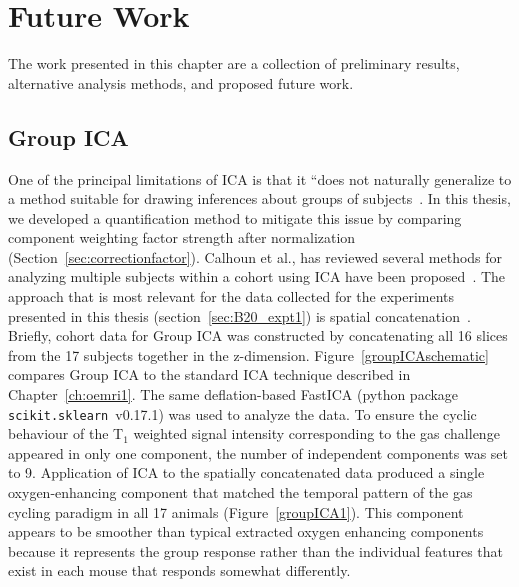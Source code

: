 
\chapter{Future Work}
\label{ch:futurework}

The work presented in this chapter are a collection of preliminary results, alternative analysis methods, and proposed future work. 

\section{Group ICA}

One of the principal limitations of \acs{ICA} is that it ``does not naturally generalize to a method suitable for drawing inferences about groups of subjects~\cite{Calhoun:2009jr}.
In this thesis, we developed a quantification method to mitigate this issue by comparing component weighting factor strength after normalization (Section~\ref{sec:correctionfactor}).
Calhoun et al., has reviewed several methods for analyzing multiple subjects within a cohort using \acs{ICA} have been proposed~\cite{Calhoun:2009jr}.
The approach that is most relevant for the data collected for the experiments presented in this thesis (section~\ref{sec:B20_expt1}) is spatial concatenation~\cite{Calhoun:2001jx}.
Briefly, cohort data for Group ICA was constructed by concatenating all 16 slices from the 17 subjects together in the z-dimension.
Figure~\ref{groupICAschematic} compares Group ICA to the standard ICA technique described in Chapter~\ref{ch:oemri1}.
The same deflation-based \acs{FastICA} (python package \texttt{scikit.sklearn}~v0.17.1) was used to analyze the data.
To ensure the cyclic behaviour of the T$_1$ weighted signal intensity corresponding to the gas challenge appeared in only one component, the number of independent components was set to 9.
Application of \acs{ICA} to the spatially concatenated data produced a single oxygen-enhancing component that matched the temporal pattern of the gas cycling paradigm in all 17 animals (Figure~\ref{groupICA1}). 
This component appears to be smoother than typical extracted oxygen enhancing components because it represents the group response rather than the individual features that exist in each mouse that responds somewhat differently.

